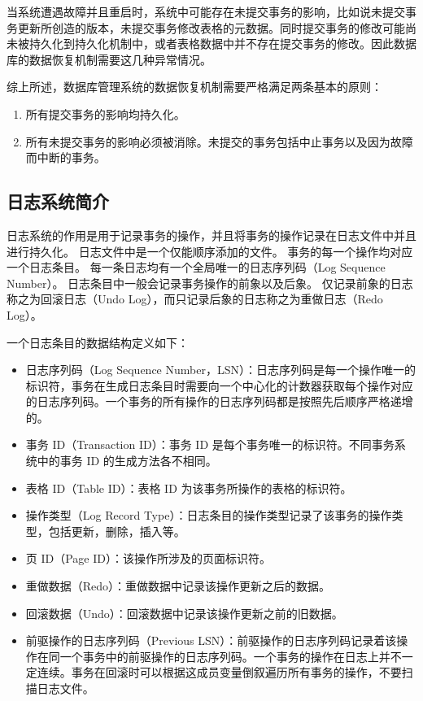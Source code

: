 当系统遭遇故障并且重启时，系统中可能存在未提交事务的影响，比如说未提交事务更新所创造的版本，未提交事务修改表格的元数据。同时提交事务的修改可能尚未被持久化到持久化机制中，或者表格数据中并不存在提交事务的修改。因此数据库的数据恢复机制需要这几种异常情况。

综上所述，数据库管理系统的数据恢复机制需要严格满足两条基本的原则：
\begin{enumerate}
    \item 所有提交事务的影响均持久化。
    \item 所有未提交事务的影响必须被消除。未提交的事务包括中止事务以及因为故障而中断的事务。
\end{enumerate}


\subsection{日志系统简介}

日志系统的作用是用于记录事务的操作，并且将事务的操作记录在日志文件中并且进行持久化。
日志文件中是一个仅能顺序添加的文件。
事务的每一个操作均对应一个日志条目。
每一条日志均有一个全局唯一的日志序列码（Log Sequence Number）。
日志条目中一般会记录事务操作的前象以及后象。
仅记录前象的日志称之为回滚日志（Undo Log），而只记录后象的日志称之为重做日志（Redo Log）。

一个日志条目的数据结构定义如下：
\begin{itemize}
    \item 日志序列码（Log Sequence Number，LSN）：日志序列码是每一个操作唯一的标识符，事务在生成日志条目时需要向一个中心化的计数器获取每个操作对应的日志序列码。一个事务的所有操作的日志序列码都是按照先后顺序严格递增的。
    \item 事务 ID（Transaction ID）：事务 ID 是每个事务唯一的标识符。不同事务系统中的事务 ID 的生成方法各不相同。
    \item 表格 ID（Table ID）：表格 ID 为该事务所操作的表格的标识符。
    \item 操作类型（Log Record Type）：日志条目的操作类型记录了该事务的操作类型，包括更新，删除，插入等。
    \item 页 ID（Page ID）：该操作所涉及的页面标识符。
    \item 重做数据（Redo）：重做数据中记录该操作更新之后的数据。
    \item 回滚数据（Undo）：回滚数据中记录该操作更新之前的旧数据。
    \item 前驱操作的日志序列码（Previous LSN）：前驱操作的日志序列码记录着该操作在同一个事务中的前驱操作的日志序列码。一个事务的操作在日志上并不一定连续。事务在回滚时可以根据这成员变量倒叙遍历所有事务的操作，不要扫描日志文件。
\end{itemize}


